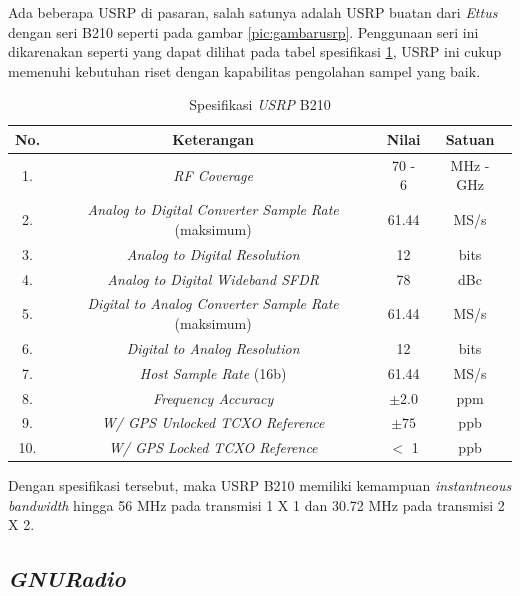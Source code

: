 Ada beberapa USRP di pasaran, salah satunya adalah USRP buatan dari \textit{Ettus} dengan seri B210 seperti pada gambar \ref{pic:gambarusrp}. Penggunaan seri ini dikarenakan seperti yang dapat dilihat pada tabel spesifikasi \ref{tab:spekb210}, USRP ini cukup memenuhi kebutuhan riset dengan kapabilitas pengolahan sampel yang baik.

\begin{longtable}{|c|c|c|c|}
	\caption{Spesifikasi \textit{USRP} B210}
	\label{tab:spekb210}\\
	\hline
	No. & Keterangan & Nilai & Satuan \\
	\hline
	1. & \textit{RF Coverage} & 70 - 6 & MHz - GHz \\
	\hline
	2. & \textit{Analog to Digital Converter Sample Rate} (maksimum) & 61.44 & MS/s \\
	\hline
	3. & \textit{Analog to Digital Resolution}  & 12 & bits	\\
	\hline
	4. &\textit{Analog to Digital Wideband SFDR} & 78 & dBc \\
	\hline
	5. & \textit{Digital to Analog Converter Sample Rate} (maksimum) & 61.44 & MS/s \\
	\hline
	6. & \textit{Digital to Analog Resolution}  & 12 & bits	\\
	\hline
	7. & \textit{Host Sample Rate} (16b) & 61.44 & MS/s \\
	\hline
	8. & \textit{Frequency Accuracy} & $\pm 2.0$ & ppm \\
	\hline
	9. &  \textit{W/ GPS Unlocked TCXO Reference} & $\pm 75$ & ppb \\
	\hline
	10. & \textit{W/ GPS Locked TCXO Reference} & $<$ 1 & ppb \\ 
	\hline
\end{longtable}

Dengan spesifikasi tersebut, maka USRP B210 memiliki kemampuan \textit{instantneous bandwidth} hingga 56 MHz pada transmisi 1 X 1 dan 30.72 MHz pada transmisi 2 X 2.

\subsection{\textit{GNURadio}}

